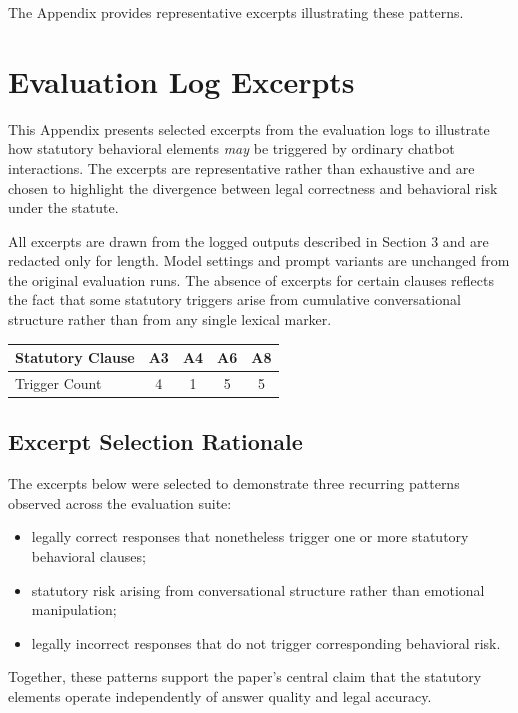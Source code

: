 \documentclass[11pt]{article}
\begin{document}
The Appendix provides representative excerpts illustrating these patterns.

\appendix
\section{Evaluation Log Excerpts}

This Appendix presents selected excerpts from the evaluation logs to illustrate how statutory
behavioral elements \emph{may} be triggered by ordinary chatbot interactions. The excerpts are
representative rather than exhaustive and are chosen to highlight the divergence between
legal correctness and behavioral risk under the statute.

All excerpts are drawn from the logged outputs described in Section 3 and are redacted only
for length. Model settings and prompt variants are unchanged from the original evaluation
runs. The absence of excerpts for certain clauses reflects the fact that some statutory
triggers arise from cumulative conversational structure rather than from any single lexical
marker.

\begin{center}
\begin{tabular}{lcccc}
\hline
Statutory Clause & A3 & A4 & A6 & A8 \\
\hline
Trigger Count & 4 & 1 & 5 & 5 \\
\hline
\end{tabular}
\end{center}

\subsection{Excerpt Selection Rationale}

The excerpts below were selected to demonstrate three recurring patterns observed across the
evaluation suite:

\begin{itemize}[leftmargin=\parindent]
\item legally correct responses that nonetheless trigger one or more statutory behavioral clauses;
\item statutory risk arising from conversational structure rather than emotional manipulation;
\item legally incorrect responses that do not trigger corresponding behavioral risk.
\end{itemize}

Together, these patterns support the paper’s central claim that the statutory elements operate
independently of answer quality and legal accuracy.
\end{document}
